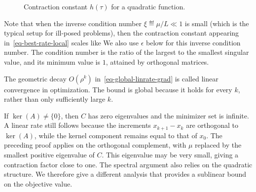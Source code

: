 \begin{figure}[tbp]
\centering
{}
\caption{Contraction constant $h(\tau)$ for a quadratic function.}
\label{fig-grad-desc-contract}
\end{figure}

Note that when the inverse condition number $\xi\eqdef\mu/L\ll1$
is small (which is the typical setup for ill-posed problems), then the contraction constant appearing in~\eqref{eq-best-rate-local} scales like 
%
We also use $\epsilon$ below for this inverse condition number. The condition number is the ratio of the largest to the smallest singular value, and its minimum value is $1$, attained by orthogonal matrices.

The geometric decay $O(\rho^k)$ in~\eqref{eq-global-linrate-grad} is called linear convergence in optimization. The bound is global because it holds for every $k$, rather than only sufficiently large $k$.

If $\ker(A) \neq \{0\}$, then $C$ has zero eigenvalues and the minimizer set is infinite.
%
A linear rate still follows because the increments $x_{k+1}-x_k$ are orthogonal to $\ker(A)$, while the kernel component remains equal to that of $x_0$. The preceding proof applies on the orthogonal complement, with $\mu$ replaced by the smallest positive eigenvalue of $C$. This eigenvalue may be very small, giving a contraction factor close to one. The spectral argument also relies on the quadratic structure. We therefore give a different analysis that provides a sublinear bound on the objective value.

